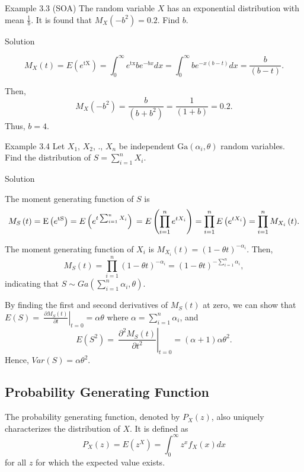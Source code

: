 \documentclass[]{book}
\theoremstyle{definition}
\theoremstyle{definition}
\theoremstyle{definition}
\theoremstyle{remark}
\begin{document}
Example 3.3 (SOA) The random variable \(X\) has an exponential
distribution with mean \(\frac{1}{b}\). It is found that
\(M_{X}\left( - b^{2} \right) = 0.2\). Find \(b\).

Solution

\[M_{X}\left( t \right) = E\left( e^{\text{tX}} \right) = \int_{0}^{\infty}{e^{\text{tx}}be^{- bx} dx} = \int_{0}^{\infty}{be^{- x\left( b - t \right)} dx} = \frac{b}{\left( b - t \right)}.\]

Then,
\[M_{X}\left( - b^{2} \right) = \frac{b}{\left( b + b^{2} \right)} = \frac{1}{\left( 1 + b \right)} = 0.2.\]
Thus, \(b = 4\).

Example 3.4 Let \(X_{1}\), \(X_{2}\), ., \(X_{n}\) be independent
\(\text{Ga}\left( \alpha_{i},\theta \right)\) random variables. Find the
distribution of \(S = \sum_{i = 1}^{n}X_{i}\).

Solution

The moment generating function of \(S\) is
\[M_{S}\left( t \right) = \text{E}\left( e^{\text{tS}} \right) = E\left( e^{t\sum_{i = 1}^{n}X_{i}} \right) \\
= E\left( \prod_{i = 1}^{n}e^{tX_{i}} \right) = \prod_{i = 1}^{n}{E\left( e^{tX_{i}} \right) = \prod_{i = 1}^{n}{M_{X_{i}}\left( t \right)}} .\]

The moment generating function of \(X_{i}\) is
\(M_{X_{i}}\left( t \right) = \left( 1 - \theta t \right)^{- \alpha_{i}}\).
Then,
\[M_{S}\left( t \right) = \prod_{i = 1}^{n}\left( 1 - \theta t \right)^{- \alpha_{i}} = \left( 1 - \theta t \right)^{- \sum_{i = 1}^{n}\alpha_{i}}, \]
indicating that
\(S\sim Ga\left( \sum_{i = 1}^{n}\alpha_{i},\theta \right)\).

By finding the first and second derivatives of \(M_{S}\left( t \right)\)
at zero, we can show that
\(E\left( S \right) = \left. \ \frac{\partial M_{S}\left( t \right)}{\partial t} \right|_{t = 0} = \alpha\theta\)
where \(\alpha = \sum_{i = 1}^{n}\alpha_{i}\), and
\[E\left( S^{2} \right) = \left. \ \frac{\partial^{2}M_{S}\left( t \right)}{\partial t^{2}} \right|_{t = 0} = \left( \alpha + 1 \right)\alpha\theta^{2}.\]
Hence, \(Var\left( S \right) = \alpha\theta^{2}\).

\subsection{Probability Generating
Function}\label{probability-generating-function-1}

The probability generating function, denoted by
\(P_{X}\left( z \right)\), also uniquely characterizes the distribution
of \(X\). It is defined as
\[P_{X}\left( z \right) = E\left( z^{X} \right) = \int_{0}^{\infty}{z^{x}f_{X}\left( x \right) dx}\]
for all \(z\) for which the expected value exists.
\end{document}
